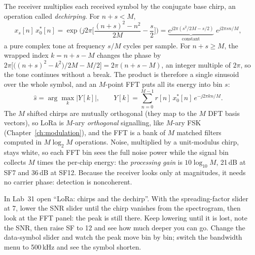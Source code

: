 The receiver multiplies each received symbol by the conjugate base chirp, an operation called
\emph{dechirping}. For $n+s<M$,
\begin{equation}
x_s[n]\,x_0^*[n]=\exp\!\Big(j2\pi\Big[\frac{(n+s)^2-n^2}{2M}-\frac s2\Big]\Big)
=\underbrace{e^{j2\pi(s^2/2M-s/2)}}_{\text{constant}}\;e^{j2\pi sn/M},
\label{eq:ch22:dechirp}
\end{equation}
a pure complex tone at frequency $s/M$ cycles per sample. For $n+s\ge M$, the wrapped index
$k=n+s-M$ changes the phase by $2\pi\big[\big((n+s)^2-k^2\big)/2M-M/2\big]=2\pi(n+s-M)$, an integer
multiple of $2\pi$, so the tone continues without a break. The product is therefore a single sinusoid
over the whole symbol, and an $M$-point FFT puts all its energy into bin $s$:
\begin{equation}
\hat s=\arg\max_k\big|Y[k]\big|,\qquad Y[k]=\sum_{n=0}^{M-1}r[n]\,x_0^*[n]\,e^{-j2\pi kn/M}.
\label{eq:ch22:lorademod}
\end{equation}
The $M$ shifted chirps are mutually orthogonal (they map to the $M$ DFT basis vectors), so LoRa is
$M$-ary \emph{orthogonal} signalling, like $M$-ary FSK (Chapter~\ref{ch:modulation}), and the FFT is a
bank of $M$ matched filters computed in $M\log_2M$ operations. Noise, multiplied by a unit-modulus
chirp, stays white, so each FFT bin sees the full noise power while the signal bin collects $M$ times
the per-chip energy: the \emph{processing gain} is $10\log_{10}M$, 21\,dB at SF7 and 36\,dB at SF12.
Because the receiver looks only at magnitudes, it needs no carrier phase: detection is noncoherent.


\begin{tryit}
In Lab~31 open ``LoRa: chirps and the dechirp''. With the spreading-factor slider at 7, lower the
SNR slider until the chirp vanishes from the spectrogram, then look at the FFT panel: the peak is
still there. Keep lowering until it is lost, note the SNR, then raise SF to 12 and see how much
deeper you can go. Change the data-symbol slider and watch the peak move bin by bin; switch the
bandwidth menu to 500\,kHz and see the symbol shorten.
\end{tryit}

